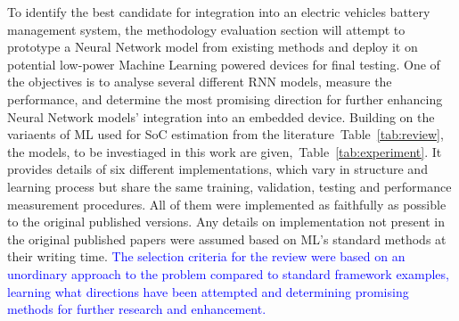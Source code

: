 %
To identify the best candidate for integration into an electric vehicles battery management system, the methodology evaluation section will attempt to prototype a Neural Network model from existing methods and deploy it on potential low-power Machine Learning powered devices for final testing.
One of the objectives is to analyse several different RNN models, measure the performance, and determine the most promising direction for further enhancing Neural Network models' integration into an embedded device.
Building on the variaents of ML used for SoC estimation from the literature~\mbox{Table~\ref{tab:review}}, the models, to be investiaged in this work are given,~\mbox{Table~\ref{tab:experiment}}.
It provides details of six different implementations, which vary in structure and learning process but share the same training, validation, testing and performance measurement procedures.
All of them were implemented as faithfully as possible to the original published versions.
Any details on implementation not present in the original published papers were assumed based on ML's standard methods at their writing time.
\textcolor{blue}{
The selection criteria for the review were based on an unordinary approach to the problem compared to standard framework examples, learning what directions have been attempted and determining promising methods for further research and enhancement.
}
